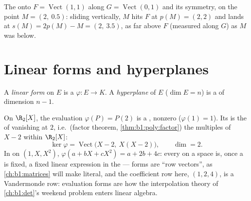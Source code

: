 \begin{omfigure}

{\small The  onto $F = \operatorname{Vect}(1,1)$ along
$G = \operatorname{Vect}(0,1)$ and its symmetry, on the point $M
= (2,\ 0.5)$: sliding vertically, $M$ hits $F$ at $p(M) = (2,2)$
and lands at $s(M) = 2p(M) - M = (2,\ 3.5)$, as far above $F$
(measured along $G$) as $M$ was below.}
\end{omfigure}

\section{Linear forms and hyperplanes}

\begin{definition}\label{def:b1:linmaps:forms}
A \emph{linear form} on $E$ is a 
$\varphi \colon E \to K$. A \emph{hyperplane} of
$E$ ($\dim E = n$) is a  of dimension $n - 1$.
\end{definition}

\begin{example}
\label{ex:b1:linmaps:evaluationform}
On $\R_2[X]$, the evaluation $\varphi(P) = P(2)$ is a , nonzero ($\varphi(1) = 1$). Its  is the 
of  vanishing at $2$, i.e.\ (factor theorem,
\cref{thm:b1:poly:factor}) the multiples of $X - 2$ within
$\R_2[X]$:
\[
\ker\varphi = \operatorname{Vect}\bigl(X - 2,\ X(X - 2)\bigr),
\qquad \dim = 2 .
\]
In  on $(1, X, X^2)$, $\varphi(a + bX + cX^2) = a +
2b + 4c$: every  on a  space is,
once a  is fixed, a fixed linear expression in the
 --- forms are ``row vectors'', as
\cref{ch:b1:matrices} will make literal, and the coefficient
row here, $(1, 2, 4)$, is a Vandermonde row: evaluation forms
are how the interpolation theory of \cref{ch:b1:det}'s weekend
problem enters linear algebra.
\end{example}

